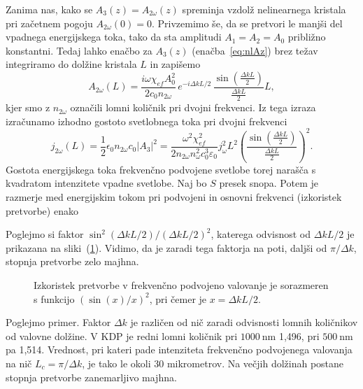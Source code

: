 Zanima nas, kako se $A_{3}(z) = A_{2\omega}(z)$ spreminja vzdolž nelinearnega kristala
pri začetnem pogoju $A_{2\omega}(0)=0$.
Privzemimo še, da se pretvori le manjši del vpadnega energijskega toka,
tako da sta amplitudi $A_{1}=A_{2}=A_0$ približno konstantni. Tedaj lahko
enačbo za $A_{3}(z)$ (enačba~\ref{eq:nlAz}) brez težav integriramo do dolžine kristala $L$ in 
zapišemo
\begin{equation}
A_{2\omega}(L)=\frac{i\omega \chi_{ef} A_0^2}{2c_0 n_{2\omega}}
\,e^{-i\Delta kL/2}\, \frac{\sin\left(\frac{\Delta k L}{2}\right)}{\frac{\Delta kL}{2}}L,
\label{8.9}
\end{equation}
kjer smo z $n_{2\omega}$ označili lomni količnik pri dvojni frekvenci.
Iz tega izraza izračunamo izhodno gostoto svetlobnega toka pri dvojni
frekvenci 
\begin{equation}
j_{2\omega}(L) =\frac{1}{2}\epsilon_{0}n_{2\omega}c_0|A_3|^2 = 
\frac{\omega^2 \chi_{ef}^2}{2 n_{2\omega} n_\omega^2c_0^3\varepsilon_0} j_\omega^2 L^2
\left(\frac{\sin\left(\frac{\Delta k L}{2}\right)}{\frac{\Delta kL}{2}}\right)^2.
\label{8.10}
\end{equation}
Gostota energijskega toka frekvenčno podvojene svetlobe torej narašča s kvadratom
intenzitete vpadne svetlobe. Naj bo $S$ presek snopa. Potem je razmerje med 
energijskim tokom pri podvojeni in osnovni frekvenci (izkoristek pretvorbe) enako

Poglejmo si faktor $\sin^{2}(\Delta kL/2)/(\Delta kL/2)^{2}$, katerega odvisnost
od $\Delta kL/2$ je prikazana na sliki~(\ref{fig:shg2}). Vidimo, da je zaradi tega
faktorja na poti, daljši od $\pi /\Delta k$, stopnja pretvorbe zelo majhna.
\begin{figure}[h]
\centering
\def\svgwidth{90truemm} 

\caption{Izkoristek pretvorbe v frekvenčno podvojeno valovanje je 
sorazmeren s funkcijo $(\sin(x)/x)^2$,
pri čemer je $x = \Delta k L/2$.}
\label{fig:shg2}
\end{figure}

Poglejmo primer. Faktor $\Delta k$ je različen od nič zaradi odvisnosti
lomnih količnikov od valovne dolžine. V KDP je 
redni lomni količnik pri $1000~\si{\nano\metre}$ 1,496, pri $500~\si{\nano\metre}$ pa 1,514. Vrednost, pri kateri
pade intenziteta frekvenčno podvojenega valovanja na nič
$L_{c}=\pi /\Delta k$, je tako le okoli 30 mikrometrov. Na večjih dolžinah
postane stopnja pretvorbe zanemarljivo majhna.

